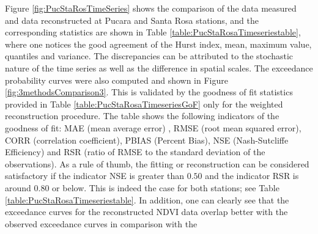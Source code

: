 {Figure \ref{fig:PucStaRosTimeSeries} shows the comparison of the data measured 
and data reconstructed at Pucara and Santa Rosa stations, and the corresponding statistics are shown in Table 
\ref{table:PucStaRosaTimeseriestable}, where one notices the good agreement of 
the Hurst index, mean, maximum value, quantiles and variance. The 
discrepancies can be attributed to the stochastic nature of the 
time series as well as the difference in spatial scales.  The exceedance probability curves were also computed and shown in Figure  
\ref{fig:3methodsComparison3}. This is validated by the goodness of fit statistics provided in Table \ref{table:PucStaRosaTimeseriesGoF} only for the weighted reconstruction procedure. The table shows the following indicators of the goodness of 
fit: MAE (mean average error) , RMSE (root mean squared error), CORR (correlation coefficient), PBIAS (Percent Bias), NSE (Nash-Sutcliffe Efficiency) and RSR (ratio of RMSE to the standard deviation of the observations). As a rule of thumb, the fitting or reconstruction can be considered satisfactory if the indicator NSE is greater than $0.50$ and the indicator RSR is around $0.80$ or below. This is indeed the case for both 
stations; see Table \ref{table:PucStaRosaTimeseriestable}. In addition, one 
can clearly see that the exceedance curves for the reconstructed NDVI data 
overlap better with the observed exceedance curves in comparison with the 
}
